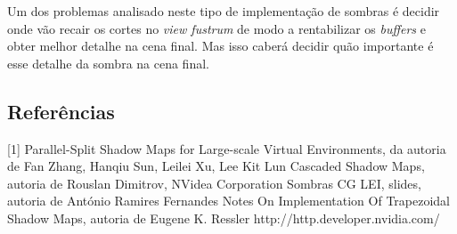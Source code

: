 \documentclass[12pt]{article}
\begin{document}
Um dos problemas analisado neste tipo de implementação de sombras é decidir onde vão recair os cortes no {\it view fustrum} de modo a rentabilizar os {\it buffers} e obter melhor detalhe na cena final. Mas isso caberá decidir quão importante é esse detalhe da sombra na cena final.

\subsection{Referências}

[1] Parallel-Split Shadow Maps for Large-scale Virtual Environments, da autoria de Fan Zhang, Hanqiu Sun, Leilei Xu, Lee Kit Lun \newline
[2] Cascaded Shadow Maps, autoria de Rouslan Dimitrov, NVidea Corporation \newline
[3] Sombras CG LEI, slides, autoria de António Ramires Fernandes \newline
[4] Notes On Implementation Of Trapezoidal Shadow Maps, autoria de Eugene K. Ressler \newline
[5] http://http.developer.nvidia.com/ \newline
\end{document}
